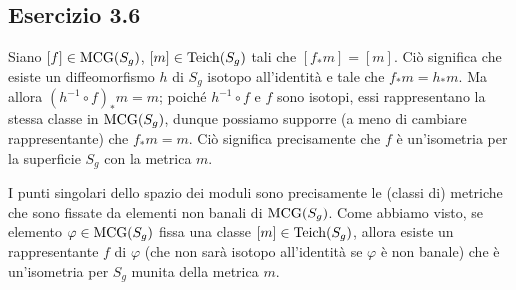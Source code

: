 \begin{center}
\end{center}

\subsection*{Esercizio 3.6}
Siano $[f]\in\operatorname{MCG}(S_g)$, $[m]\in\operatorname{Teich}(S_g)$ tali che $[f_*m]=[m]$. Ciò significa che esiste un diffeomorfismo $h$ di $S_g$ isotopo all'identità e tale che $f_*m=h_*m$. Ma allora $(h^{-1}\circ f)_*m=m$; poiché $h^{-1}\circ f$ e $f$ sono isotopi, essi rappresentano la stessa classe in $\operatorname{MCG}(S_g)$, dunque possiamo supporre (a meno di cambiare rappresentante) che $f_*m=m$. Ciò significa precisamente che $f$ è un'isometria per la superficie $S_g$ con la metrica $m$.

I punti singolari dello spazio dei moduli sono precisamente le (classi di) metriche che sono fissate da elementi non banali di $\operatorname{MCG}(S_g)$. Come abbiamo visto, se elemento $\varphi\in\operatorname{MCG}(S_g)$ fissa una classe $[m]\in\operatorname{Teich}(S_g)$, allora esiste un rappresentante $f$ di $\varphi$ (che non sarà isotopo all'identità se $\varphi$ è non banale) che è un'isometria per $S_g$ munita della metrica $m$.